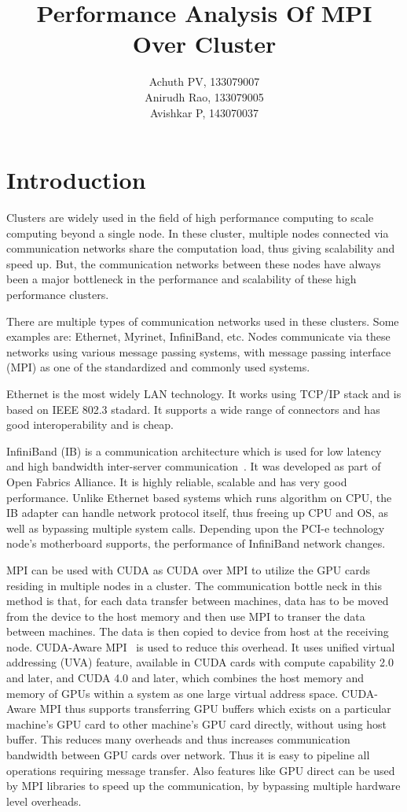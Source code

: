\documentclass[10pt]{article}
\title{\textbf{Performance Analysis Of MPI Over Cluster}}
\author{Achuth PV, 133079007\\
		Anirudh Rao, 133079005\\
		Avishkar P, 143070037}
\date{}
\begin{document}
\maketitle

\section{Introduction}

Clusters are widely used in the field of high performance computing to scale  computing beyond a single node. In these cluster, multiple nodes connected via communication networks share the computation load, thus giving scalability and speed up. But, the communication networks between these nodes have always been a major bottleneck in the performance and scalability of these high performance clusters.

There are multiple types of communication networks used in these clusters. Some examples are: Ethernet, Myrinet, InfiniBand, etc. Nodes communicate via these networks using various message passing systems, with message passing interface (MPI) as one of the standardized and commonly used systems.

Ethernet is the most widely LAN technology. It works using TCP/IP stack and  is based on IEEE 802.3 stadard. It supports a wide range of connectors and has good interoperability and is cheap. 

InfiniBand (IB) is a communication architecture which is used for low latency and high bandwidth inter-server communication~\cite{pfister2001introduction}. It was developed as part of Open Fabrics Alliance. It is highly reliable, scalable and has very good performance. Unlike Ethernet based systems which runs algorithm on CPU, the IB adapter can handle network protocol itself, thus freeing up CPU and OS, as well as bypassing multiple system calls. Depending upon the PCI-e technology node's motherboard supports, the performance of InfiniBand network changes. 

MPI can be used with CUDA as CUDA over MPI to utilize the GPU cards residing in multiple nodes in a cluster. The communication bottle neck in this method is that, for each data transfer between machines, data has to be moved from the device to the host memory and then use MPI to transer the data between machines. The data is then copied to device from host at the receiving node. CUDA-Aware MPI~\cite{cudaaware,cheng2014professional} is used to reduce this overhead. It uses unified virtual addressing (UVA) feature, available in CUDA cards with compute capability 2.0 and later, and CUDA 4.0 and later, which combines the host memory and memory of GPUs within a system as one large virtual address space. CUDA-Aware MPI thus supports transferring GPU buffers which exists on a particular machine's GPU card to other machine's GPU card directly, without using host buffer. This reduces many overheads and thus increases communication bandwidth between GPU cards over network. Thus it is easy to pipeline all operations requiring message transfer. Also features like GPU direct can be used by MPI libraries to speed up the communication, by bypassing multiple hardware level overheads. 
\end{document}
